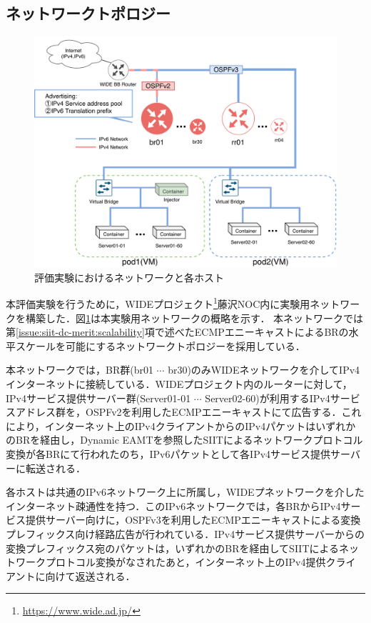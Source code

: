 \subsection{ネットワークトポロジー}
\begin{figure}[H]
    \begin{center}
    \includegraphics[width=15cm,pagebox=cropbox,clip]{img/evaluation_experiment.pdf}
    \end{center}
    \caption{評価実験におけるネットワークと各ホスト}
    \label{fig:evaluation_experiment}
\end{figure}

本評価実験を行うために，WIDEプロジェクト\footnote{\url{https://www.wide.ad.jp/}}藤沢NOC内に実験用ネットワークを構築した．図\ref{fig:evaluation_experiment}は本実験用ネットワークの概略を示す．
本ネットワークでは第\ref{issue:siit-dc-merit:scalability}項で述べたECMPエニーキャストによるBRの水平スケールを可能にするネットワークトポロジーを採用している．


本ネットワークでは，BR群(br01 $\cdots$ br30)のみWIDEネットワークを介してIPv4インターネットに接続している．WIDEプロジェクト内のルーターに対して，IPv4サービス提供サーバー群(Server01-01  $\cdots$ Server02-60)が利用するIPv4サービスアドレス群を，OSPFv2\cite{RFC2328}を利用したECMPエニーキャストにて広告する．これにより，インターネット上のIPv4クライアントからのIPv4パケットはいずれかのBRを経由し，Dynamic EAMTを参照したSIITによるネットワークプロトコル変換が各BRにて行われたのち，IPv6パケットとして各IPv4サービス提供サーバーに転送される．

各ホストは共通のIPv6ネットワーク上に所属し，WIDEプネットワークを介したインターネット疎通性を持つ．このIPv6ネットワークでは，各BRからIPv4サービス提供サーバー向けに，OSPFv3\cite{RFC5340}を利用したECMPエニーキャストによる変換プレフィックス向け経路広告が行われている．IPv4サービス提供サーバーからの変換プレフィックス宛のパケットは，いずれかのBRを経由してSIITによるネットワークプロトコル変換がなされたあと，インターネット上のIPv4提供クライアントに向けて返送される．

